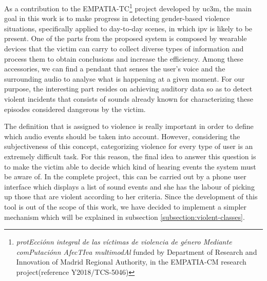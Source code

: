 	As a contribution to the EMPATIA-TC\footnote{\textit{protEcciónn integral de las víctimas de violencia de género Mediante comPutaciónn AfecTIva multimodAl} funded by Department  of  Research  and Innovation of Madrid Regional Authority, in the EMPATIA-CM research project(reference  Y2018/TCS-5046)} project developed by \acrlong{uc3m}, the main goal in this work is to make progress in detecting gender-based violence situations, specifically applied to day-to-day scenes, in which \acrshort{ipv} is likely to be present. One of the parts from the proposed system is composed by wearable devices that the victim can carry to collect diverse types of information and process them to obtain conclusions and increase the efficiency. Among these accessories, we can find a pendant that senses the user's voice and the surrounding audio to analyse what is happening at a given moment. For our purpose, the interesting part resides on achieving auditory data so as to detect violent incidents that consists of sounds already known for characterizing these episodes considered dangerous by the victim.
	
	The definition that is assigned to violence is really important in order to define which audio events should be taken into account. However, considering the subjectiveness of this concept, categorizing violence for every type of user is an extremely difficult task. For this reason, the final idea to answer this question is to make the victim able to decide which kind of hearing events the system must be aware of. In the complete project, this can be carried out by a phone user interface which displays a list of sound events and she has the labour of picking up those that are violent according to her criteria. Since the development of this tool is out of the scope of this work, we have decided to implement a simpler mechanism which will be explained in subsection \ref{subsection:violent-classes}.
	
%
	


